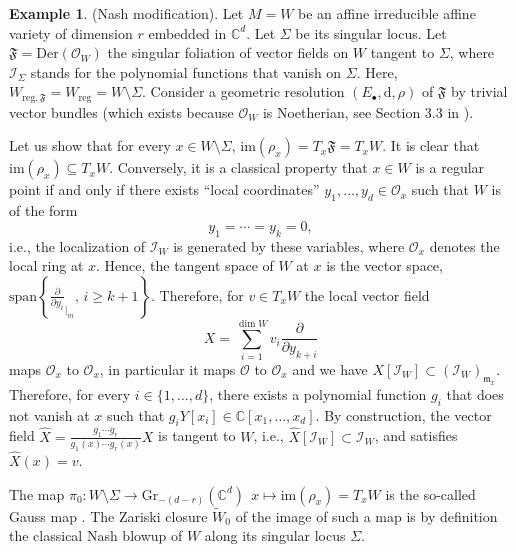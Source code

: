 \documentclass[10pt]{article}
\theoremstyle{plain}
\theoremstyle{definition}
\newtheorem{example}[lemma]{Example}
\theoremstyle{remark}
\newcommand{\dd}{\mathrm{d}}
\begin{document}
\begin{example}(Nash modification). \label{ex:Nash}
Let $M=W$ be an affine irreducible affine variety of dimension $r$ embedded in $\mathbb C^d$. Let  $\Sigma$ be its singular locus. Let $\mathfrak{F}= \mathrm {Der}(\mathcal O_W) %
$ the singular foliation of vector fields on $W$ tangent to $\Sigma$, where $\mathcal{I}_\Sigma$ stands for the polynomial functions that vanish on $\Sigma$. Here, $W_{\mathrm{reg},\mathfrak F}= W_{\mathrm{reg}}= W\setminus \Sigma$. Consider a geometric resolution $(E_{\bullet}, \dd, \rho)$ of $\mathfrak F$ by trivial vector bundles (which exists because $\mathcal{O}_W$ is Noetherian, see Section 3.3 in \cite{LLS}). %

Let us show that for every $x\in W\setminus\Sigma$,
$\mathrm{im}(\rho_x)= T_x\mathfrak{F}= T_xW$. It is clear that $\mathrm{im}(\rho_x)\subseteq T_xW$. Conversely, it is a classical property that $x\in W$ is a regular point if and only if there exists “local coordinates” $y_1,\ldots, y_d\in \mathcal O_x $ such that $W$ is of the form
 $$y_1 = \cdots = y_k = 0,$$
 i.e., the localization of $\mathcal I_W $ is generated by these variables, where $\mathcal O_x$ denotes the local ring at $x$. Hence, the tangent space of $W$ at $x$ is the vector space, $\mathrm{span}\left\{{\frac{\partial}{\partial y_i}}_{|_m},\, i\geq k+1\right\}$. Therefore, for $v\in T_xW$ the local vector field
 $$X=\sum_{i=1}^{\dim W}v_i\frac{\partial }{\partial y_{k+i}}$$ maps $ \mathcal{O}_{x}$ to $\mathcal{O}_{x}$, in particular it maps $\mathcal{O}$ to $\mathcal{O}_{x}$ and we have ${X}[\mathcal I_W]\subset ({\mathcal{I}_W})_{\mathfrak m_x}$. Therefore, for every $i\in \{1,\ldots,d\}$, there exists a  polynomial function $g_i$ that does not vanish at $x$ such that $g_iY[x_i]\in\mathbb{C}[x_1,\ldots, x_d]$. By construction, the vector field $\hat{X}=\frac{g_1\cdots g_{r}}{g_1(x)\cdots g_{r}(x)}X$ is tangent to $W$, i.e., $\hat{X}[\mathcal I_W]\subset \mathcal{I}_W$, and satisfies $\hat{X}(x)=v$.
 
 The map $\pi_0\colon W\setminus\Sigma \longrightarrow \mathrm{Gr}_{-(d-r)}(\mathbb{C}^d)\,\; x\longmapsto \mathrm{im}(\rho_x)=T_xW$ is the so-called Gauss map \cite{D.T}. The Zariski closure $\widetilde{W}_0$ of the image of such a map is by definition the classical Nash blowup of $W$ along  its singular locus $\Sigma$.
\end{example}
\end{document}
